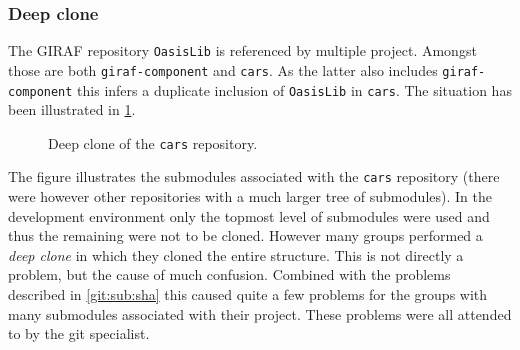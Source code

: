 \subsubsection{Deep clone}\label{git:sub:deep}
The GIRAF repository \texttt{OasisLib} is referenced by multiple project.
Amongst those are both \texttt{giraf-component} and \texttt{cars}.
As the latter also includes \texttt{giraf-component} this infers a duplicate inclusion of \texttt{OasisLib} in \texttt{cars}.
The situation has been illustrated in \cref{git:sub:clonefig}.
\begin{figure}[h]
\centering
{}
\caption{Deep clone of the \texttt{cars} repository.}
\label{git:sub:clonefig}
\end{figure}
The figure illustrates the submodules associated with the \texttt{cars} repository (there were however other repositories with a much larger tree of submodules).
In the development environment only the topmost level of submodules were used and thus the remaining were not to be cloned.
However many groups performed a \textit{deep clone} in which they cloned the entire structure.
This is not directly a problem, but the cause of much confusion.
Combined with the problems described in \cref{git:sub:sha} this caused quite a few problems for the groups with many submodules associated with their project.
These problems were all attended to by the git specialist.


